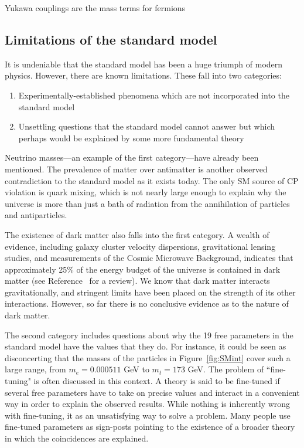 Yukawa couplings are the mass terms for fermions

\subsection{Limitations of the standard model}
\label{sec:SMweakness}
It is undeniable that the standard model has been a huge triumph of modern physics. However, there are known limitations. These fall into two categories: 
\begin{enumerate}
	\item Experimentally-established phenomena which are not incorporated into the standard model
	\item Unsettling questions that the standard model cannot answer but which perhaps would be explained by some more fundamental theory
\end{enumerate}

Neutrino masses---an example of the first category---have already been mentioned. The prevalence of matter over antimatter is another observed contradiction to the standard model as it exists today. The only SM source of CP violation is quark mixing, which is not nearly large enough to explain why the universe is more than just a bath of radiation from the annihilation of particles and antiparticles. 

The existence of dark matter also falls into the first category. A wealth of evidence, including galaxy cluster velocity dispersions, gravitational lensing studies, and measurements of the Cosmic Microwave Background, indicates that approximately 25\% of the energy budget of the universe is contained in dark matter (see Reference~\cite{DarkMatterReview} for a review). We know that dark matter interacts gravitationally, and stringent limits have been placed on the strength of its other interactions. However, so far there is no conclusive evidence as to the nature of dark matter.

The second category includes questions about why the 19 free parameters in the standard model have the values that they do. For instance, it could be seen as disconcerting that the masses of the particles in Figure~\ref{fig:SMint} cover such a large range, from $m_e = 0.000511$ GeV to $m_t = 173$ GeV. The problem of ``fine-tuning" is often discussed in this context. A theory is said to be fine-tuned if several free parameters have to take on precise values and interact in a convenient way in order to explain the observed results. While nothing is inherently wrong with fine-tuning, it as an unsatisfying way to solve a problem. Many people use fine-tuned parameters as sign-posts pointing to the existence of a broader theory in which the coincidences are explained.

